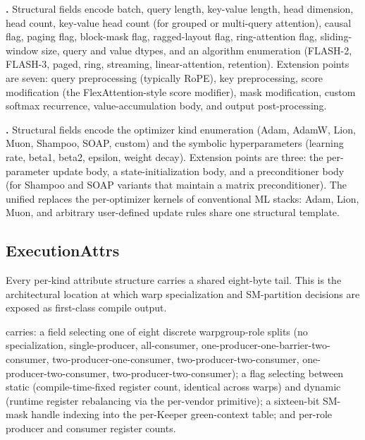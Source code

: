 \textbf{.}
Structural fields encode batch, query length, key-value length, head dimension, head count, key-value head count (for grouped or multi-query attention), causal flag, paging flag, block-mask flag, ragged-layout flag, ring-attention flag, sliding-window size, query and value dtypes, and an algorithm enumeration (FLASH-2, FLASH-3, paged, ring, streaming, linear-attention, retention).
Extension points are seven: query preprocessing (typically RoPE), key preprocessing, score modification (the FlexAttention-style score modifier), mask modification, custom softmax recurrence, value-accumulation body, and output post-processing.

\textbf{.}
Structural fields encode the optimizer kind enumeration (Adam, AdamW, Lion, Muon, Shampoo, SOAP, custom) and the symbolic hyperparameters (learning rate, beta1, beta2, epsilon, weight decay).
Extension points are three: the per-parameter update body, a state-initialization body, and a preconditioner body (for Shampoo and SOAP variants that maintain a matrix preconditioner).
The unified   replaces the per-optimizer kernels of conventional ML stacks: Adam, Lion, Muon, and arbitrary user-defined update rules share one structural template.

\subsection{ExecutionAttrs}
\label{sec:ir002-execution-attrs}

Every per-kind attribute structure carries a shared eight-byte  tail.
This is the architectural location at which warp specialization and SM-partition decisions are exposed as first-class compile output.

\begin{definition}[ExecutionAttrs]
\label{def:ir002-execution-attrs}
 carries: a  field selecting one of eight discrete warpgroup-role splits (no specialization, single-producer, all-consumer, one-producer-one-barrier-two-consumer, two-producer-one-consumer, two-producer-two-consumer, one-producer-two-consumer, two-producer-two-consumer); a  flag selecting between static (compile-time-fixed register count, identical across warps) and dynamic (runtime register rebalancing via the per-vendor primitive); a sixteen-bit SM-mask handle indexing into the per-Keeper green-context table; and per-role producer and consumer register counts.
\end{definition}

